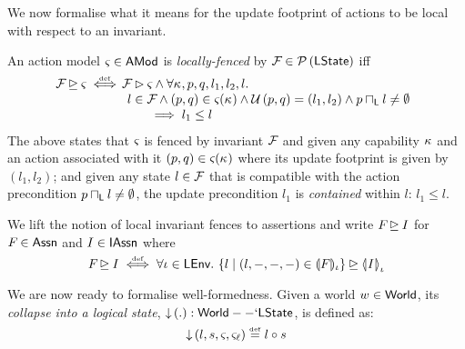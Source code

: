 %
%
We now formalise what it means for the update footprint of actions to be local with respect to an invariant.
%
\begin{definition}
An action model $\amod{} \in \AMods$ is \emph{locally-fenced} by $\fence{} \in \pset{\LStates}$ iff
%
\[
\hspace*{-0.2cm}
\begin{array}{l l}
	\fence{} \strictfences \amod{} \iffdef 
	&
		\hspace*{-0.3cm}
		\fence{} \fences \amod{} \land
		\for{\ca{}, p, q, l_1, l_2, l}\\
	&
		\hspace*{-0.15cm}
		l \in \fence{} \land 
		(p, q) \in \amod{}(\ca{}) \land 
		\updateFP{p, q} = (l_1, l_2) \land 
		p \meetL l \not= \emptyset\\
	&
		\hspace*{0.5cm}
		\implies
		l_1 \leq l
\end{array}
\]
%
The above states that $\amod{}$ is fenced by invariant $\fence{}$ and given any capability $\ca{}$ and an action associated with it $(p, q) \in \amod{}(\ca{})$ where its update footprint is given by $(l_1, l_2)$; and given any state $l \in \fence{}$ that is compatible with the action precondition $p \meetL l \not= \emptyset$, the update precondition $l_1$ is \emph{contained} within $l$: $l_1 \leq l$. 
%

We lift the notion of local invariant fences to assertions and write $\fenceAss{} \strictfences I$  for $\fenceAss{} \in \Assertions$ and $I \in \IAssertions$ where
%
\[
	\fenceAss{} \strictfences I \iffdef \for{\lenv \in \LEnv} \left\{ l \mid (l, -, -, -) \in \intermediateSem[\lenv]{F} \right\} \strictfences \semI[\lenv]{I}
\]
%
\end{definition}

We are now ready to formalise well-formedness.  Given a world $w \in
\Worlds$, its \emph{collapse into a logical state}, $ \collapseW{.}:
\Worlds --` \LStates $, is defined as:
\[
	\collapseW{l, s, \amod{}, \amod{\ell}} \eqdef l \composeL s
\]

